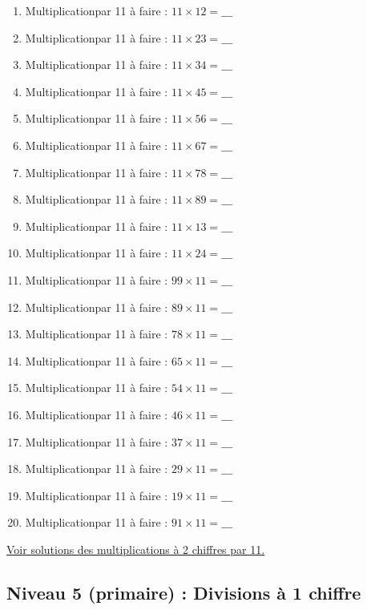 \documentclass[11pt]{article}
\begin{document}
\begin{enumerate}
\item Multiplicationpar 11 à faire :  \(11\times 12 = \_\_\_\)
\item Multiplicationpar 11 à faire :  \(11\times 23 = \_\_\_\)
\item Multiplicationpar 11 à faire :  \(11\times 34 = \_\_\_\)
\item Multiplicationpar 11 à faire :  \(11\times 45 = \_\_\_\)
\item Multiplicationpar 11 à faire :  \(11\times 56 = \_\_\_\)
\item Multiplicationpar 11 à faire :  \(11\times 67 = \_\_\_\)
\item Multiplicationpar 11 à faire :  \(11\times 78 = \_\_\_\)
\item Multiplicationpar 11 à faire :  \(11\times 89 = \_\_\_\)
\item Multiplicationpar 11 à faire :  \(11\times 13 = \_\_\_\)
\item Multiplicationpar 11 à faire :  \(11\times 24 = \_\_\_\)
\item Multiplicationpar 11 à faire :  \(99\times 11 = \_\_\_\)
\item Multiplicationpar 11 à faire :  \(89\times 11 = \_\_\_\)
\item Multiplicationpar 11 à faire :  \(78\times 11 = \_\_\_\)
\item Multiplicationpar 11 à faire :  \(65\times 11 = \_\_\_\)
\item Multiplicationpar 11 à faire :  \(54\times 11 = \_\_\_\)
\item Multiplicationpar 11 à faire :  \(46\times 11 = \_\_\_\)
\item Multiplicationpar 11 à faire :  \(37\times 11 = \_\_\_\)
\item Multiplicationpar 11 à faire :  \(29\times 11 = \_\_\_\)
\item Multiplicationpar 11 à faire :  \(19\times 11 = \_\_\_\)
\item Multiplicationpar 11 à faire :  \(91\times 11 = \_\_\_\)
\end{enumerate}




\hyperref[orge768c2f]{Voir solutions des multiplications à 2 chiffres par 11.}




\newpage

\subsection{Niveau 5 (primaire) : Divisions à 1 chiffre}
\label{sec:orgb392b9a}
\label{org929aa32}
\end{document}
